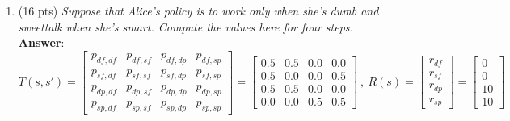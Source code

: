 \documentclass[fleqn]{hw4}
\begin{document}
\begin{enumerate}
\item(16 pts) \textit{Suppose that Alice's policy is to work only when she's dumb and sweettalk when she's smart.
Compute the values here for four steps. } \\
\textbf{Answer}:
$$ T(s,s') = \begin{bmatrix}
p_{df,df} & p_{df,sf} & p_{df,dp} & p_{df,sp} \\
p_{sf,df} & p_{sf,sf} & p_{sf,dp} & p_{sf,sp} \\
p_{dp,df} & p_{dp,sf} & p_{dp,dp} & p_{dp,sp} \\
p_{sp,df} & p_{sp,sf} & p_{sp,dp} & p_{sp,sp} 
\end{bmatrix} = \begin{bmatrix}
0.5 & 0.5 & 0.0 & 0.0 \\
0.5 & 0.0 & 0.0 & 0.5 \\
0.5 & 0.5 & 0.0 & 0.0 \\
0.0 & 0.0 & 0.5 & 0.5
\end{bmatrix} \ , \ R(s) = \begin{bmatrix}
r_{df} \\
r_{sf} \\
r_{dp} \\
r_{sp} 
\end{bmatrix} = \begin{bmatrix}
0 \\
0 \\
10 \\
10 
\end{bmatrix}  $$ \\


\end{enumerate}
\end{document}
